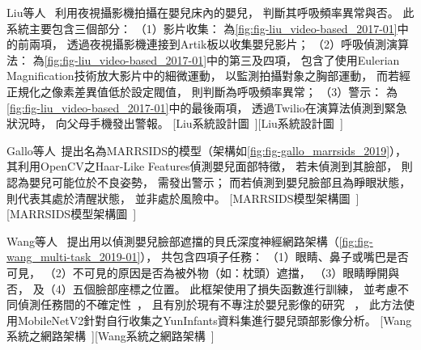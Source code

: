 \documentclass[class=NCU_thesis, crop=false]{standalone}
\begin{document}
Liu等人~\cite{liu_video-based_2017}
利用夜視攝影機拍攝在嬰兒床內的嬰兒，
判斷其呼吸頻率異常與否。
此系統主要包含三個部分：
（1）影片收集：
為\cref{fig:fig-liu_video-based_2017-01}中的前兩項，
透過夜視攝影機連接到Artik板以收集嬰兒影片；
（2）呼吸偵測演算法：
為\cref{fig:fig-liu_video-based_2017-01}中的第三及四項，
包含了使用Eulerian Magnification技術放大影片中的細微運動，
以監測拍攝對象之胸部運動，
而若經正規化之像素差異值低於設定閥值，
則判斷為呼吸頻率異常；
（3）警示：
為\cref{fig:fig-liu_video-based_2017-01}中的最後兩項，
透過Twilio在演算法偵測到緊急狀況時，
向父母手機發出警報。
[Liu系統設計圖~\cite{liu_video-based_2017}][Liu系統設計圖~\cite{liu_video-based_2017}]

Gallo等人~\cite{gallo_marrsids_2019}提出名為MARRSIDS的模型（架構如\cref{fig:fig-gallo_marrsids_2019}），
其利用OpenCV之Haar-Like Features偵測嬰兒面部特徵，
若未偵測到其臉部，
則認為嬰兒可能位於不良姿勢，
需發出警示；
而若偵測到嬰兒臉部且為睜眼狀態，
則代表其處於清醒狀態，
並非處於風險中。
[MARRSIDS模型架構圖~\cite{gallo_marrsids_2019}][MARRSIDS模型架構圖~\cite{gallo_marrsids_2019}]

Wang等人~\cite{wang_multi-task_2019}
提出用以偵測嬰兒臉部遮擋的貝氏深度神經網路架構（\cref{fig:fig-wang_multi-task_2019-01}），
共包含四項子任務：
（1）眼睛、鼻子或嘴巴是否可見，
（2）不可見的原因是否為被外物（如：枕頭）遮擋，
（3）眼睛睜開與否，
及（4）五個臉部座標之位置。
此框架使用了損失函數進行訓練，
並考慮不同偵測任務間的不確定性~\cite{kendall_what_2017}，
且有別於現有不專注於嬰兒影像的研究
~\cite{viitaniemi_detecting_2013, ge_detecting_2017, ghiasi_using_2015}，
此方法使用MobileNetV2針對自行收集之YunInfants資料集進行嬰兒頭部影像分析。
[Wang系統之網路架構~\cite{wang_multi-task_2019}][Wang系統之網路架構~\cite{wang_multi-task_2019}]
\end{document}

